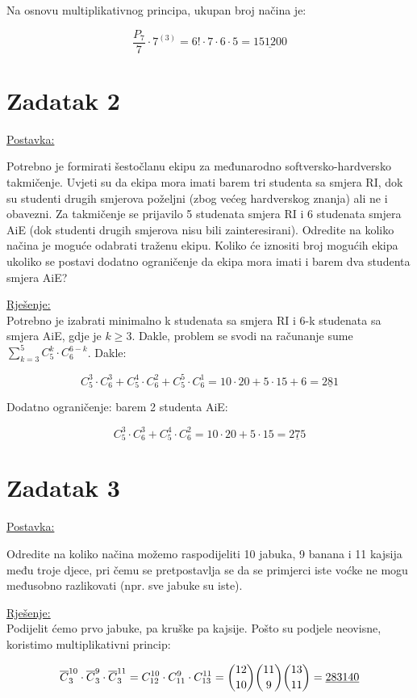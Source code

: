 \documentclass[12pt]{article}
\begin{document}
Na osnovu multiplikativnog principa, ukupan broj načina je:

$$\frac{P_{7}}{7} \cdot 7^{(3)} = 6! \cdot 7 \cdot 6 \cdot 5 = \underline{151200}$$
\newpage
\section*{Zadatak 2\label{Z2}}

\underline{Postavka:}

Potrebno je formirati šestočlanu ekipu za međunarodno softversko-hardversko takmičenje. Uvjeti su da ekipa mora imati barem tri studenta sa smjera RI, dok su studenti drugih smjerova poželjni (zbog većeg hardverskog znanja) ali ne i obavezni. Za takmičenje se prijavilo 5 studenata smjera RI i 6 studenata smjera AiE (dok studenti drugih smjerova nisu bili zainteresirani). Odredite na koliko načina je moguće odabrati traženu ekipu. Koliko će iznositi broj mogućih ekipa ukoliko se postavi dodatno ograničenje da ekipa mora imati i barem dva studenta smjera AiE?

\underline{Rješenje:}\\

Potrebno je izabrati minimalno k studenata sa smjera RI i 6-k studenata sa smjera AiE, gdje je $k \geq 3$. Dakle, problem se svodi na računanje sume $\sum_{k=3}^{5} C_{5}^k \cdot C_{6}^{6-k}$. Dakle:

$$C_{5}^3 \cdot C_{6}^3 + C_{5}^4 \cdot C_{6}^2 +  C_{5}^5 \cdot C_{6}^1 = 10 \cdot 20 + 5 \cdot 15 + 6 = \underline{281}$$

Dodatno ograničenje: barem 2 studenta AiE:

$$C_{5}^3 \cdot C_{6}^3 + C_{5}^4 \cdot C_{6}^2 = 10 \cdot 20 + 5 \cdot 15 = \underline{275}$$
\newpage
\section*{Zadatak 3\label{Z3}}

\underline{Postavka:}

Odredite na koliko načina možemo raspodijeliti 10 jabuka, 9 banana i 11 kajsija među troje djece, pri čemu se pretpostavlja se da se primjerci iste voćke ne mogu međusobno razlikovati (npr. sve jabuke su iste).

\underline{Rješenje:}\\

Podijelit ćemo prvo jabuke, pa kruške pa kajsije. Pošto su podjele neovisne, koristimo multiplikativni princip:

$$\overline{C}_{3}^{10} \cdot \overline{C}_{3}^9 \cdot \overline{C}_{3}^{11} = C_{12}^{10} \cdot C_{11}^9 \cdot C_{13}^{11} = \dbinom{12}{10} \dbinom{11}{9} \dbinom{13}{11} = \underline{283140}$$
\newpage
\end{document}
